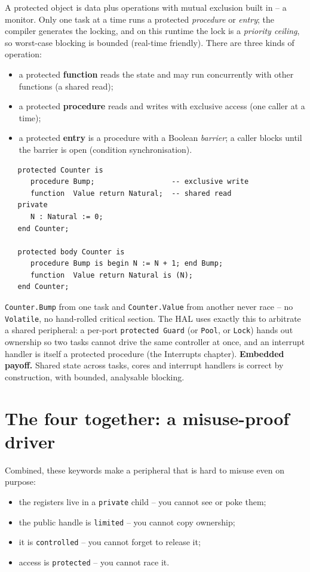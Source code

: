 A protected object is data plus operations with mutual exclusion built in -- a
monitor. Only one task at a time runs a protected \emph{procedure} or
\emph{entry}; the compiler generates the locking, and on this runtime the lock is
a \emph{priority ceiling}, so worst-case blocking is bounded (real-time
friendly). There are three kinds of operation:

\begin{itemize}
  \item a protected \textbf{function} reads the state and may run concurrently
        with other functions (a shared read);
  \item a protected \textbf{procedure} reads and writes with exclusive access
        (one caller at a time);
  \item a protected \textbf{entry} is a procedure with a Boolean \emph{barrier};
        a caller blocks until the barrier is open (condition synchronisation).
\end{itemize}

\begin{lstlisting}
   protected Counter is
      procedure Bump;                  -- exclusive write
      function  Value return Natural;  -- shared read
   private
      N : Natural := 0;
   end Counter;

   protected body Counter is
      procedure Bump is begin N := N + 1; end Bump;
      function  Value return Natural is (N);
   end Counter;
\end{lstlisting}

\texttt{Counter.Bump} from one task and \texttt{Counter.Value} from another never
race -- no \texttt{Volatile}, no hand-rolled critical section. The HAL uses
exactly this to arbitrate a shared peripheral: a per-port \texttt{protected Guard}
(or \texttt{Pool}, or \texttt{Lock}) hands out ownership so two tasks cannot drive
the same controller at once, and an interrupt handler is itself a protected
procedure (the Interrupts chapter). \textbf{Embedded payoff.} Shared state across
tasks, cores and interrupt handlers is correct by construction, with bounded,
analysable blocking.

\section{The four together: a misuse-proof driver}

Combined, these keywords make a peripheral that is hard to misuse even on purpose:

\begin{itemize}
  \item the registers live in a \texttt{private} child -- you cannot see or poke
        them;
  \item the public handle is \texttt{limited} -- you cannot copy ownership;
  \item it is \texttt{controlled} -- you cannot forget to release it;
  \item access is \texttt{protected} -- you cannot race it.
\end{itemize}

